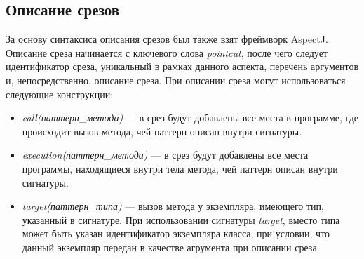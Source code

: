 \subsection{Описание срезов}
\label{sub:custom_pointcut_syntax}
За основу синтаксиса описания срезов был также взят фреймворк AspectJ.
Описание среза начинается с ключевого слова \textit{pointcut}, после чего
следует идентификатор среза, уникальный в рамках данного аспекта, перечень
аргументов и, непосредственно, описание среза.
При описании среза могут использоваться следующие конструкции:
\begin{itemize}
	\item \textit{call(паттерн\_метода)} --- в срез будут добавлены все места в
		  программе, где происходит вызов метода, чей паттерн описан внутри
	  	сигнатуры.
	\item \textit{execution(паттерн\_метода)} --- в срез будут добавлены все
		  места программы, находящиеся внутри тела метода, чей паттерн описан внутри
		  сигнатуры.
	\item \textit{target(паттерн\_типа)} --- вызов метода у экземпляра, имеющего
		  тип, указанный в сигнатуре.
		  При использовании сигнатуры \textit{target}, вместо типа может быть указан
		  идентификатор экземпляра класса, при условии, что данный экземпляр передан
		  в качестве агрумента при описании среза.
\end{itemize}

